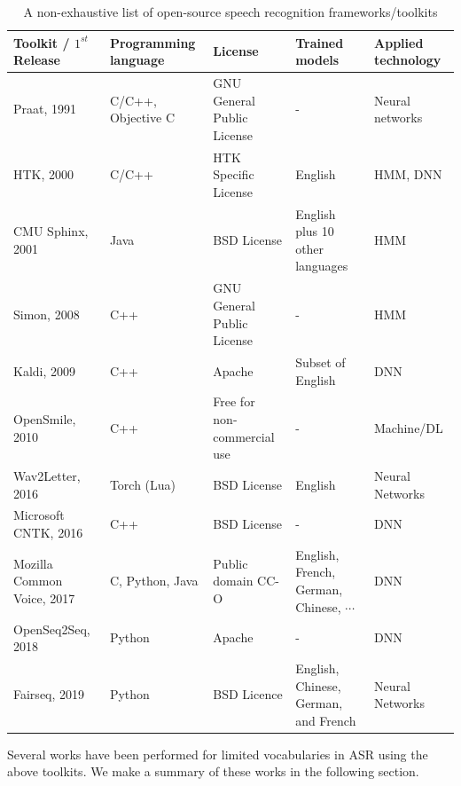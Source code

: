 \begin{table}
\caption{A non-exhaustive list of open-source speech recognition frameworks/toolkits}\label{tab5}
\centering
\begin{tabular}{ p{3cm} p{2cm} p{3cm} p{4cm} p{4cm}}
 \hline
Toolkit / $1^{st}$ Release&Programming language&License&Trained models&
Applied technology\\
 \hline
Praat, 1991& C/C++, Objective C& GNU General Public License&-&Neural networks\\
HTK, 2000&C/C++&HTK Specific License&English&HMM, DNN\\
CMU Sphinx, 2001&Java&BSD License&English plus 10 other languages&HMM\\
Simon, 2008& C++&GNU General Public License&-&HMM\\
Kaldi, 2009&C++&Apache&Subset of English& DNN \\
OpenSmile, 2010&C++&Free for non-commercial use&-&Machine/DL\\
Wav2Letter, 2016&Torch (Lua)&BSD License&English& Neural Networks\\
Microsoft CNTK, 2016&C++&BSD License&-& DNN\\
Mozilla Common Voice, 2017&C, Python, Java&Public domain CC-O&English, French, German, Chinese, $\cdots$ & DNN\\
OpenSeq2Seq, 2018&Python&Apache&-& DNN\\
Fairseq, 2019&Python&BSD Licence&English, Chinese, German, and French&Neural Networks\\
 \hline
\end{tabular}
\end{table}
Several works have been performed for limited vocabularies in ASR using the above toolkits. We make a summary of these works in the following section.



